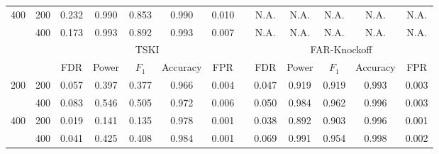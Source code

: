 ﻿\documentclass[12pt]{article}
\newcommand{\0}{\mbox{\bf 0}}
\theoremstyle{plain}%
\theoremstyle{definition}
\begin{document}
{\begin{table}[htbp]
{\begin{tabular}{ccccccccccccc}
		400   & 200   & 0.232  & 0.990  & 0.853  & 0.990  & 0.010  &       & N.A.  & N.A.  & N.A.  & N.A.  & N.A.  \\
		& 400   & 0.173  & 0.993  & 0.892  & 0.993  & 0.007  &       & N.A.  & N.A.  & N.A.  & N.A.  & N.A. \\
		&       & \multicolumn{5}{c}{TSKI}              &       & \multicolumn{5}{c}{FAR-Knockoff} \\
		\cmidrule{3-7}\cmidrule{9-13}          &       & FDR & Power & $F_{1}$ & Accuracy & FPR   &       & FDR & Power & $F_{1}$ & Accuracy & FPR \\
		200   & 200   & 0.057  & 0.397  & 0.377  & 0.966  & 0.004  &       & 0.047 & 0.919 & 0.919 & 0.993 & 0.003 \\

		& 400   & 0.083  & 0.546  & 0.505  & 0.972  & 0.006  &       & 0.050 & 0.984 & 0.962 & 0.996 & 0.003 \\

		400   & 200   & 0.019  & 0.141  & 0.135  & 0.978  & 0.001  &       & 0.038 & 0.892 & 0.903 & 0.996 & 0.001 \\

		& 400   & 0.041  & 0.425  & 0.408  & 0.984  & 0.001  &       & 0.069 & 0.991 & 0.954 & 0.998 & 0.002 \\

		\bottomrule
	\end{tabular}}
\end{table}



}
\end{document}
